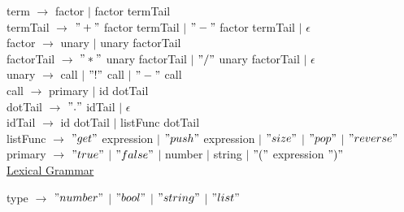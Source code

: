 \documentclass{article}
\begin{document}
term $\rightarrow$ factor $\vert$ factor termTail \\

termTail $\rightarrow$ $"+"$ factor termTail $\vert$ $"-"$ factor termTail $\vert$ $\epsilon$ \\

factor $\rightarrow$ unary $\vert$ unary factorTail \\

factorTail $\rightarrow$ $"*"$ unary factorTail $\vert$ $"/"$ unary factorTail $\vert$ $\epsilon$ \\

unary $\rightarrow$ call $\vert$ $"!"$ call $\vert$ $"-"$ call \\

call $\rightarrow$ primary $\vert$ id dotTail \\

dotTail $\rightarrow$ $"."$ idTail $\vert$ $\epsilon$ \\

idTail $\rightarrow$ id dotTail $\vert$ listFunc dotTail \\

listFunc $\rightarrow$ $"get"$ expression $\vert$ $"push"$ expression $\vert$ $"size"$ $\vert$ $"pop"$ $\vert$ $"reverse"$ \\

primary $\rightarrow$ $"true"$ $\vert$ $"false"$ $\vert$ number $\vert$ string $\vert$ $"("$ expression $")"$ \\

\underline{Lexical Grammar}

type $\rightarrow$ $"number"$ $\vert$ $"bool"$ $\vert$ $"string"$ $\vert$ $"list"$ \\
\end{document}
